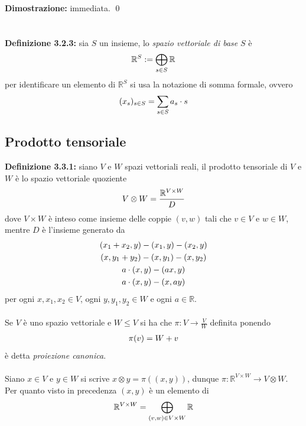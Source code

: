 \documentclass{article}
\begin{document}
\textbf{Dimostrazione:} immediata. \qed \\ \\ \\
\textbf{Definizione 3.2.3:} sia $S$ un insieme, lo \textit{spazio vettoriale di base} $S$ è
\begin{gather}
    \mathbb{R}^S := \bigoplus_{s \in S} \mathbb{R} \notag
\end{gather}
per identificare un elemento di $\mathbb{R}^S$ si usa la notazione di somma formale, ovvero
\begin{gather}
    (x_s)_{s \in S} = \sum_{s \in S} a_s \cdot s \notag
\end{gather}

\newpage
\subsection{Prodotto tensoriale}
\textbf{Definizione 3.3.1:} siano $V$ e $W$ spazi vettoriali reali, il prodotto tensoriale di $V$ e $W$ è lo spazio vettoriale quoziente
\begin{gather}
    V \otimes W = \frac{\mathbb{R}^{V \times W}}{D} \notag
\end{gather}
dove $V \times W$ è inteso come insieme delle coppie $(v, w)$ tali che $v \in V$ e $w \in W$, mentre $D$ è l'insieme generato da
\begin{gather}
    (x_1 + x_2, y) - (x_1, y) - (x_2, y) \notag \\
    (x, y_1 + y_2) - (x, y_1) - (x, y_2) \notag \\
    a \cdot (x, y) - (ax, y) \notag \\
    a \cdot (x, y) - (x, ay) \notag
\end{gather}
per ogni $x, x_1, x_2 \in V$, ogni $y, y_1, y_2 \in W$ e ogni $a \in \mathbb{R}$. \\ \\
Se $V$ è uno spazio vettoriale e $W \leq V$ si ha che $\pi : V \longrightarrow \frac{V}{W}$ definita ponendo
\begin{gather}
    \pi(v) = W + v \notag
\end{gather}
è detta \textit{proiezione canonica}. \\ \\
Siano $x \in V$ e $y \in W$ si scrive $x \otimes y = \pi ((x, y))$, dunque $\pi : \mathbb{R}^{V \times W} \longrightarrow V \otimes W$. \\
Per quanto visto in precedenza $(x, y)$ è un elemento di
\begin{gather}
    \mathbb{R}^{V \times W} = \bigoplus_{(v, w) \in V \times W} \mathbb{R} \notag
\end{gather}
\end{document}
